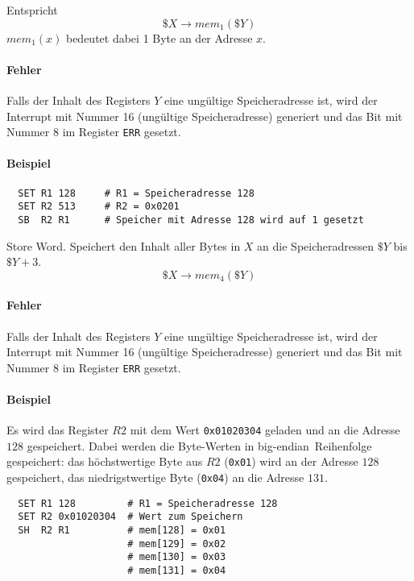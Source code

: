 Entspricht
\[
    \$X \to mem_{1} (\$Y)
\]
$mem_{1}(x)$ bedeutet dabei 1 Byte an der Adresse $x$.

\paragraph{Fehler}
Falls der Inhalt des Registers $Y$ eine ungültige Speicheradresse ist, wird der
Interrupt mit Nummer 16 (ungültige Speicheradresse) generiert und das Bit mit
Nummer 8 im Register \texttt{ERR} gesetzt.

\paragraph{Beispiel}
\begin{lstlisting}
  SET R1 128     # R1 = Speicheradresse 128
  SET R2 513     # R2 = 0x0201
  SB  R2 R1      # Speicher mit Adresse 128 wird auf 1 gesetzt
\end{lstlisting}




\glqq Store Word\grqq.
Speichert den Inhalt aller Bytes in $X$ an die Speicheradressen $\$Y$ bis 
$\$Y + 3$.
\[
    \$X \to mem_{4}(\$Y)
\]

\paragraph{Fehler}
Falls der Inhalt des Registers $Y$ eine ungültige Speicheradresse ist, wird der
Interrupt mit Nummer 16 (ungültige Speicheradresse) generiert und das Bit mit
Nummer 8 im Register \texttt{ERR} gesetzt.


\paragraph{Beispiel}
Es wird das Register $R2$ mit dem Wert \texttt{0x01020304} geladen und an die
Adresse $128$ gespeichert. Dabei werden die Byte-Werten in 
\glqq big-endian\grqq\ Reihenfolge gespeichert: das höchstwertige Byte aus $R2$
(\texttt{0x01}) wird an der Adresse $128$ gespeichert, das niedrigstwertige
Byte (\texttt{0x04}) an die Adresse $131$.

\begin{lstlisting}
  SET R1 128         # R1 = Speicheradresse 128
  SET R2 0x01020304  # Wert zum Speichern
  SH  R2 R1          # mem[128] = 0x01
                     # mem[129] = 0x02
                     # mem[130] = 0x03
                     # mem[131] = 0x04
\end{lstlisting}





